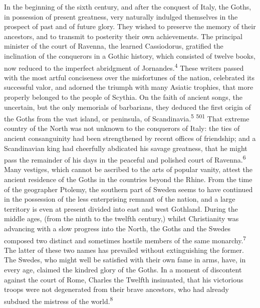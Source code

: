 In the beginning of the sixth century, and after the conquest of
Italy, the Goths, in possession of present greatness, very
naturally indulged themselves in the prospect of past and of
future glory. They wished to preserve the memory of their
ancestors, and to transmit to posterity their own achievements.
The principal minister of the court of Ravenna, the learned
Cassiodorus, gratified the inclination of the conquerors in a
Gothic history, which consisted of twelve books, now reduced to
the imperfect abridgment of Jornandes.\textsuperscript{4} These writers passed
with the most artful conciseness over the misfortunes of the
nation, celebrated its successful valor, and adorned the triumph
with many Asiatic trophies, that more properly belonged to the
people of Scythia. On the faith of ancient songs, the uncertain,
but the only memorials of barbarians, they deduced the first
origin of the Goths from the vast island, or peninsula, of
Scandinavia.\textsuperscript{5} \textsuperscript{501} That extreme country of the North was not
unknown to the conquerors of Italy: the ties of ancient
consanguinity had been strengthened by recent offices of
friendship; and a Scandinavian king had cheerfully abdicated his
savage greatness, that he might pass the remainder of his days in
the peaceful and polished court of Ravenna.\textsuperscript{6} Many vestiges,
which cannot be ascribed to the arts of popular vanity, attest
the ancient residence of the Goths in the countries beyond the
Rhine. From the time of the geographer Ptolemy, the southern part
of Sweden seems to have continued in the possession of the less
enterprising remnant of the nation, and a large territory is even
at present divided into east and west Gothland. During the middle
ages, (from the ninth to the twelfth century,) whilst
Christianity was advancing with a slow progress into the North,
the Goths and the Swedes composed two distinct and sometimes
hostile members of the same monarchy.\textsuperscript{7} The latter of these two
names has prevailed without extinguishing the former. The Swedes,
who might well be satisfied with their own fame in arms, have, in
every age, claimed the kindred glory of the Goths. In a moment of
discontent against the court of Rome, Charles the Twelfth
insinuated, that his victorious troops were not degenerated from
their brave ancestors, who had already subdued the mistress of
the world.\textsuperscript{8}


